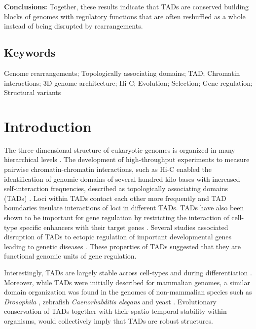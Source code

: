 \documentclass[a4paper,twoside=true,openright,parskip=full,chapterprefix=true,11pt,headings=normal,bibliography=totoc,listof=totoc,titlepage=on,captions=tableabove,draft=false]{scrreprt}
\theoremstyle{definition}
\theoremstyle{definition}
\theoremstyle{definition}
\theoremstyle{remark}
\begin{document}
\textbf{Conclusions:} Together, these results indicate that TADs are
conserved building blocks of genomes with regulatory functions that are
often reshuffled as a whole instead of being disrupted by
rearrangements.

\subsection*{Keywords}\label{keywords}

Genome rearrangements; Topologically associating domains; TAD; Chromatin
interactions; 3D genome architecture; Hi-C; Evolution; Selection; Gene
regulation; Structural variants

\section{Introduction}\label{introduction-1}

The three-dimensional structure of eukaryotic genomes is organized in
many hierarchical levels \citep{Bonev2016}. The development of
high-throughput experiments to measure pairwise chromatin-chromatin
interactions, such as Hi-C \citep{Lieberman-Aiden2009} enabled the
identification of genomic domains of several hundred kilo-bases with
increased self-interaction frequencies, described as topologically
associating domains (TADs) \citep{Dixon2012, Nora2012}. Loci within TADs
contact each other more frequently and TAD boundaries insulate
interactions of loci in different TADs. TADs have also been shown to be
important for gene regulation by restricting the interaction of
cell-type specific enhancers with their target genes
\citep{Nora2012, Symmons2014, Zhan2017}. Several studies associated
disruption of TADs to ectopic regulation of important developmental
genes leading to genetic diseases \citep{Ibn-Salem2014, Lupianez2015}.
These properties of TADs suggested that they are functional genomic
units of gene regulation.

Interestingly, TADs are largely stable across cell-types
\citep{Dixon2012, Rao2014} and during differentiation \citep{Dixon2015}.
Moreover, while TADs were initially described for mammalian genomes, a
similar domain organization was found in the genomes of non-mammalian
species such as \emph{Drosophila} \citep{Sexton2012}, zebrafish
\citep{Gomez-Marin2015} \emph{Caenorhabditis elegans} \citep{Crane2015}
and yeast \citep{Hsieh2015, Mizuguchi2014}. Evolutionary conservation of
TADs together with their spatio-temporal stability within organisms,
would collectively imply that TADs are robust structures.
\end{document}
